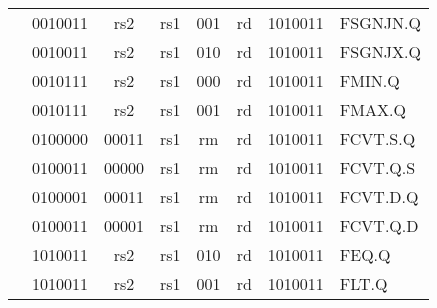 \begin{table}[p]
\begin{small}
\begin{center}
\begin{tabular}{p{0in}p{0.4in}p{0.05in}p{0.05in}p{0.05in}p{0.05in}p{0.4in}p{0.6in}p{0.4in}p{0.6in}p{0.7in}l}
&
\multicolumn{4}{|c|}{0010011} &
\multicolumn{2}{c|}{rs2} &
\multicolumn{1}{c|}{rs1} &
\multicolumn{1}{c|}{001} &
\multicolumn{1}{c|}{rd} &
\multicolumn{1}{c|}{1010011} & FSGNJN.Q \\
\cline{2-11}


&
\multicolumn{4}{|c|}{0010011} &
\multicolumn{2}{c|}{rs2} &
\multicolumn{1}{c|}{rs1} &
\multicolumn{1}{c|}{010} &
\multicolumn{1}{c|}{rd} &
\multicolumn{1}{c|}{1010011} & FSGNJX.Q \\
\cline{2-11}


&
\multicolumn{4}{|c|}{0010111} &
\multicolumn{2}{c|}{rs2} &
\multicolumn{1}{c|}{rs1} &
\multicolumn{1}{c|}{000} &
\multicolumn{1}{c|}{rd} &
\multicolumn{1}{c|}{1010011} & FMIN.Q \\
\cline{2-11}


&
\multicolumn{4}{|c|}{0010111} &
\multicolumn{2}{c|}{rs2} &
\multicolumn{1}{c|}{rs1} &
\multicolumn{1}{c|}{001} &
\multicolumn{1}{c|}{rd} &
\multicolumn{1}{c|}{1010011} & FMAX.Q \\
\cline{2-11}


&
\multicolumn{4}{|c|}{0100000} &
\multicolumn{2}{c|}{00011} &
\multicolumn{1}{c|}{rs1} &
\multicolumn{1}{c|}{rm} &
\multicolumn{1}{c|}{rd} &
\multicolumn{1}{c|}{1010011} & FCVT.S.Q \\
\cline{2-11}


&
\multicolumn{4}{|c|}{0100011} &
\multicolumn{2}{c|}{00000} &
\multicolumn{1}{c|}{rs1} &
\multicolumn{1}{c|}{rm} &
\multicolumn{1}{c|}{rd} &
\multicolumn{1}{c|}{1010011} & FCVT.Q.S \\
\cline{2-11}


&
\multicolumn{4}{|c|}{0100001} &
\multicolumn{2}{c|}{00011} &
\multicolumn{1}{c|}{rs1} &
\multicolumn{1}{c|}{rm} &
\multicolumn{1}{c|}{rd} &
\multicolumn{1}{c|}{1010011} & FCVT.D.Q \\
\cline{2-11}


&
\multicolumn{4}{|c|}{0100011} &
\multicolumn{2}{c|}{00001} &
\multicolumn{1}{c|}{rs1} &
\multicolumn{1}{c|}{rm} &
\multicolumn{1}{c|}{rd} &
\multicolumn{1}{c|}{1010011} & FCVT.Q.D \\
\cline{2-11}


&
\multicolumn{4}{|c|}{1010011} &
\multicolumn{2}{c|}{rs2} &
\multicolumn{1}{c|}{rs1} &
\multicolumn{1}{c|}{010} &
\multicolumn{1}{c|}{rd} &
\multicolumn{1}{c|}{1010011} & FEQ.Q \\
\cline{2-11}


&
\multicolumn{4}{|c|}{1010011} &
\multicolumn{2}{c|}{rs2} &
\multicolumn{1}{c|}{rs1} &
\multicolumn{1}{c|}{001} &
\multicolumn{1}{c|}{rd} &
\multicolumn{1}{c|}{1010011} & FLT.Q \\
\cline{2-11}



\end{tabular}
\end{center}
\end{small}
\end{table}
